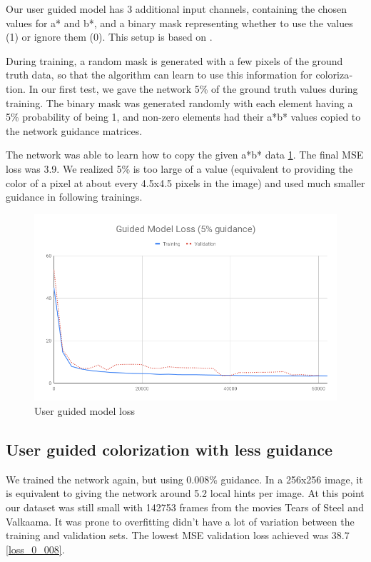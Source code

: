 \documentclass[12pt,openright,twoside,a4paper,english]{abntex2}
\begin{document}
\begin{otherlanguage}{english}
Our user guided model has 3 additional input channels, containing the chosen values for a* and b*, and a binary mask representing whether to use the values (1) or ignore them (0). This setup is based on \cite{Zhang2017}.

During training, a random mask is generated with a few pixels of the ground truth data, so that the algorithm can learn to use this information for colorization. In our first test, we gave the network 5\% of the ground truth values during training. The binary mask was generated randomly with each element having a 5\% probability of being 1, and non-zero elements had their a*b* values copied to the network guidance matrices.

The network was able to learn how to copy the given a*b* data \ref{loss_5}. The final MSE loss was 3.9. We realized 5\% is too large of a value (equivalent to providing the color of a pixel at about every 4.5x4.5 pixels in the image) and used much smaller guidance in following trainings.

\begin{figure}[!htb]
\centering
\includegraphics[width=\textwidth]{loss/Guided_5}
\caption{User guided model loss}
\label{loss_5}
\end{figure}

\subsection{User guided colorization with less guidance}

We trained the network again, but using 0.008\% guidance. In a 256x256 image, it is equivalent to giving the network around 5.2 local hints per image. At this point our dataset was still small with 142753 frames from the movies Tears of Steel and Valkaama. It was prone to overfitting didn't have a lot of variation between the training and validation sets. The lowest MSE validation loss achieved  was 38.7 \ref{loss_0_008}.


\end{otherlanguage}
\end{document}
